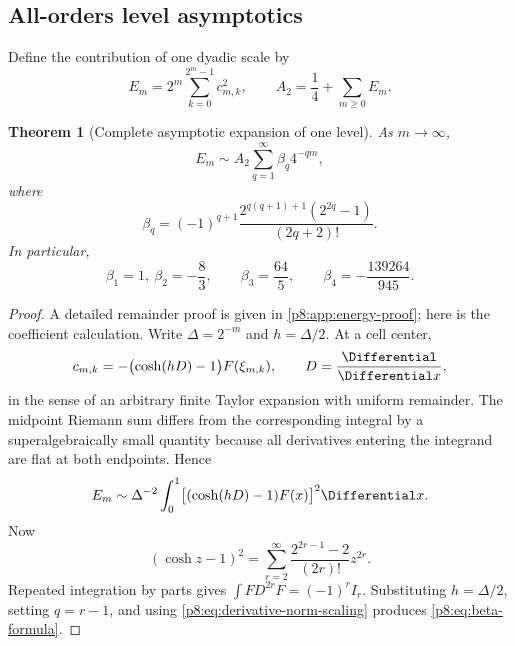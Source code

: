 \documentclass[11pt]{article}
\newtheorem{theorem}{Theorem}[section]
\theoremstyle{definition}
\theoremstyle{remark}
\begin{document}
\subsection{All-orders level asymptotics}

Define the contribution of one dyadic scale by
\begin{equation}
 E_m=2^m\sum_{k=0}^{2^m-1}c_{m,k}^2,
 \qquad A_2=\frac14+\sum_{m\ge0}E_m.                     \label{p8:eq:Em-definition}
\end{equation}

\begin{theorem}[Complete asymptotic expansion of one level]
\label{p8:thm:Em-asymptotic}
As $m\to\infty$,
\begin{equation}
 \boxed{\displaystyle
 E_m\sim A_2\sum_{q=1}^\infty\beta_q4^{-qm},}            \label{p8:eq:Em-asymptotic}
\end{equation}
where
\begin{equation}
 \boxed{\displaystyle
 \beta_q=(-1)^{q+1}
 \frac{2^{q(q+1)+1}(2^{2q}-1)}{(2q+2)!}.}                \label{p8:eq:beta-formula}
\end{equation}
In particular,
\begin{equation}
 \beta_1=1,\
 \beta_2=-\frac83,
 \qquad
 \beta_3=\frac{64}{5},
 \qquad
 \beta_4=-\frac{139264}{945}.                           \label{p8:eq:beta-first}
\end{equation}
\end{theorem}

\begin{proof}
A detailed remainder proof is given in \cref{p8:app:energy-proof}; here is the
coefficient calculation.  Write $\Delta=2^{-m}$ and $h=\Delta/2$.  At a cell
center,
\[
 c_{m,k}=-\bigl(\cosh(hD)-1\bigr)F(\xi_{m,k}),
 \qquad D=\frac{\Differential}{\Differential x},
\]
in the sense of an arbitrary finite Taylor expansion with uniform remainder.
The midpoint Riemann sum differs from the corresponding integral by a
superalgebraically small quantity because all derivatives entering the
integrand are flat at both endpoints.  Hence
\[
 E_m\sim\Delta^{-2}\int_0^1
 \bigl[(\cosh(hD)-1)F(x)\bigr]^2\Differential x.
\]
Now
\begin{equation}
 (\cosh z-1)^2
 =\sum_{r=2}^\infty
   \frac{2^{2r-1}-2}{(2r)!}z^{2r}.                       \label{p8:eq:cosh-square}
\end{equation}
Repeated integration by parts gives
$\int F D^{2r}F=(-1)^rI_r$.  Substituting
$h=\Delta/2$, setting $q=r-1$, and using
\eqref{p8:eq:derivative-norm-scaling} produces
\eqref{p8:eq:beta-formula}.
\end{proof}
\end{document}
